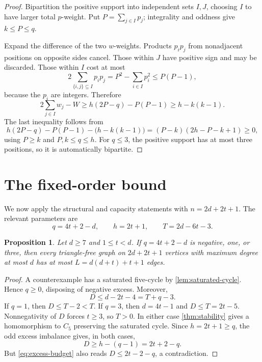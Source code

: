 \documentclass[11pt]{article}
\newtheorem{proposition}[theorem]{Proposition}
\theoremstyle{definition}
\theoremstyle{remark}
\begin{document}
\begin{proof}
Bipartition the positive support into independent sets $I,J$, choosing
$I$ to have larger total $p$-weight. Put $P=\sum_{j\in I}p_j$; integrality
and oddness give $k\le P\le q$.

Expand the difference of the two $w$-weights. Products $p_ip_j$ from
nonadjacent positions on opposite sides cancel. Those within $J$ have
positive sign and may be discarded. Those within $I$ cost at most
\[
  2\sum_{\{i,j\}\subseteq I}p_ip_j
  =P^2-\sum_{i\in I}p_i^2\le P(P-1),
\]
because the $p_i$ are integers. Therefore
\[
  2\sum_{j\in I}w_j-W
  \ge h(2P-q)-P(P-1)\ge h-k(k-1).
\]
The last inequality follows from
\[
  h(2P-q)-P(P-1)-\bigl(h-k(k-1)\bigr)
  =(P-k)(2h-P-k+1)\ge0,
\]
using $P\ge k$ and $P,k\le q\le h$.
For $q\le3$, the positive support has at most three positions, so it is
automatically bipartite.
\end{proof}

\section{The fixed-order bound}\label{sec:direct-cases}

We now apply the structural and capacity statements with
$n=2d+2t+1$. The relevant parameters are
\begin{equation}\label{eq:excess-parameters}
  q=4t+2-d,\qquad h=2t+1,\qquad
  T=2d-6t-3.
\end{equation}

\begin{proposition}\label{prop:excess-bound}
Let $d\ge7$ and $1\le t<d$. If $q=4t+2-d$ is negative, one, or three,
then every triangle-free graph on $2d+2t+1$ vertices with maximum degree
at most $d$ has at most $L=d(d+t)+t+1$ edges.
\end{proposition}

\begin{proof}
A counterexample has a saturated five-cycle by \cref{lem:saturated-cycle}.
Hence $q\ge0$, disposing of negative excess. Moreover,
\begin{equation}\label{eq:excess-budget}
  D\le d-2t-4=T+q-3.
\end{equation}
If $q=1$, then $D\le T-2<T$. If $q=3$, then $d=4t-1$ and
$D\le T=2t-5$. Nonnegativity of $D$ forces $t\ge3$, so $T>0$.
In either case \cref{thm:stability} gives a homomorphism to $C_5$
preserving the saturated cycle. Since $h=2t+1\ge q$, the odd excess
imbalance gives, in both cases,
\[
  D\ge h-(q-1)=2t+2-q.
\]
But \cref{eq:excess-budget} also reads $D\le2t-2-q$, a contradiction.
\end{proof}
\end{document}
